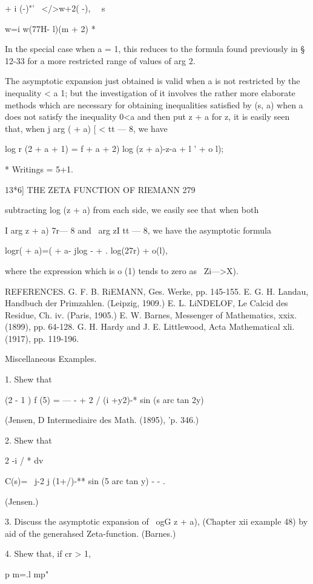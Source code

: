 {{+ i (-)"'~ </>w+2( -), \ \ s

w=i w(77H- l)(m + 2) *

In the special case when a = 1, this reduces to the formula found
previously in § 12-33 for a more restricted range of values of arg 2.

The asymptotic expansion just obtained is valid when a is not
restricted by the inequality < a 1; but the investigation of it
involves the rather more elaborate methods which are necessary for
obtaining inequalities satisfied by (s, a) when a does not satisfy the
inequality 0<a%
and then put z + a for z, it is easily seen that, when j arg ( + a) [
< tt — 8, we have

log r (2 + a + 1) = f + a + 2) log (z + a)-z-a + l ' + o l);

* Writings = 5+1.

13*6] THE ZETA FUNCTION OF RIEMANN 279

subtracting log (z + a) from each side, we easily see that when both

I arg z + a) 7r— 8 and \ arg zI tt — 8, we have the asymptotic formula

logr( + a)=( + a- jlog - + . log(27r) + o(l),

where the expression which is o (1) tends to zero as \ Zi—>X).

REFERENCES. G. F. B. RiEMANN, Ges. Werke, pp. 145-155. E. G. H.
Landau, Handbuch der Primzahlen. (Leipzig, 1909.) E. L. LiNDELOF, Le
Calcid des Residue, Ch. iv. (Paris, 1905.) E. W. Barnes, Messenger of
Mathematics, xxix. (1899), pp. 64-128. G. H. Hardy and J. E.
Littlewood, Acta Mathematical xli. (1917), pp. 119-196.

Miscellaneous Examples.

1. Shew that

(2 - 1 ) f (5) = — - + 2 / (i +y2)-* sin (s arc tan 2y)

(Jensen, D Intermediaire des Math. (1895), 'p. 346.)

2. Shew that

2 -i / * dv

C(s)= \ j-2 j (1+/)-** sin (5 arc tan y) - - .

(Jensen.)

3. Discuss the asymptotic expansion of \ ogG z + a), (Chapter xii
example 48) by aid of the generahsed Zeta-function. (Barnes.)

4. Shew that, if cr > 1,

p m=.l mp"

}}
